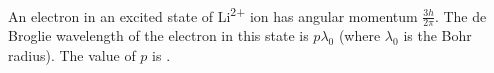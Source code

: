 
\item An electron in an excited state of Li\textsuperscript{2+} ion has angular momentum \( \frac{3h}{2\pi} \). The de Broglie wavelength of the electron in this state is \( p\lambda_0 \) (where \( \lambda_0 \) is the Bohr radius). The value of \( p \) is \underline{\hspace{2.5 cm}}.
